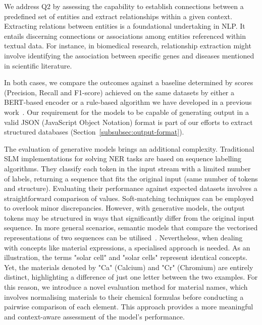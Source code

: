 We address Q2 by assessing the capability to establish connections between a predefined set of entities and extract relationships within a given context. 
Extracting relations between entities is a foundational undertaking in NLP. It entails discerning connections or associations among entities referenced within textual data. 
For instance, in biomedical research, relationship extraction might involve identifying the association between specific genes and diseases mentioned in scientific literature.

In both cases, we compare the outcomes against a baseline determined by scores (Precision, Recall and F1-score) achieved on the same datasets by either a BERT-based encoder or a rule-based algorithm we have developed in a previous work~\cite{lfoppiano2023automatic, foppiano2019quantities}.
Our requirement for the models to be capable of generating output in a valid JSON (JavaScript Object Notation) format is part of our efforts to extract structured databases (Section~\ref{subsubsec:output-format}).
 

The evaluation of generative models brings an additional complexity. 
Traditional SLM implementations for solving NER tasks are based on sequence labelling algorithms. They classify each token in the input stream with a limited number of labels, returning a sequence that fits the original input (same number of tokens and structure). 
Evaluating their performance against expected datasets involves a straightforward comparison of values. Soft-matching techniques can be employed to overlook minor discrepancies. 
However, with generative models, the output tokens may be structured in ways that significantly differ from the original input sequence. 
In more general scenarios, semantic models that compare the vectorised representations of two sequences can be utilised~\cite{reimers2019sentencebert}. 
Nevertheless, when dealing with concepts like material expressions, a specialised approach is needed. 
As an illustration, the terms "solar cell" and "solar cells" represent identical concepts. Yet, the materials denoted by "Ca" (Calcium) and "Cr" (Chromium) are entirely distinct, highlighting a difference of just one letter between the two examples.
For this reason, we introduce a novel evaluation method for material names, which involves normalising materials to their chemical formulas before conducting a pairwise comparison of each element. This approach provides a more meaningful and context-aware assessment of the model's performance.

